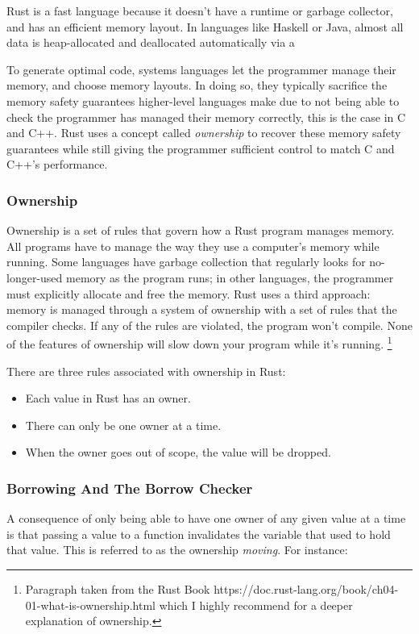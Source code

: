 \documentclass[12pt,twoside]{report}
\begin{document}
Rust is a fast language because it doesn't have a runtime or garbage collector, and has an efficient memory layout. In languages like Haskell or Java, almost all data is heap-allocated and deallocated automatically via a 

To generate optimal code, systems languages let the programmer manage their memory, and choose memory layouts. In doing so, they typically sacrifice the memory safety guarantees higher-level languages make due to not being able to check the programmer has managed their memory correctly, this is the case in C and C++. Rust uses a concept called \textit{ownership} to recover these memory safety guarantees while still giving the programmer sufficient control to match C and C++'s performance.

\subsubsection{Ownership}
Ownership is a set of rules that govern how a Rust program manages memory. All programs have to manage the way they use a computer’s memory while running. Some languages have garbage collection that regularly looks for no-longer-used memory as the program runs; in other languages, the programmer must explicitly allocate and free the memory. Rust uses a third approach: memory is managed through a system of ownership with a set of rules that the compiler checks. If any of the rules are violated, the program won’t compile. None of the features of ownership will slow down your program while it’s running. \footnote{Paragraph taken from the Rust Book https://doc.rust-lang.org/book/ch04-01-what-is-ownership.html which I highly recommend for a deeper explanation of ownership.}

There are three rules associated with ownership in Rust:
\begin{itemize}
  \item Each value in Rust has an owner.
  \item There can only be one owner at a time.
  \item When the owner goes out of scope, the value will be dropped.
\end{itemize}

\subsubsection{Borrowing And The Borrow Checker}
A consequence of only being able to have one owner of any given value at a time is that passing a value to a function invalidates the variable that used to hold that value. This is referred to as the ownership \textit{moving}. For instance:
\end{document}
